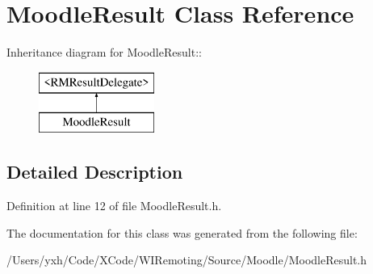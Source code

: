 \hypertarget{interface_moodle_result}{
\section{MoodleResult Class Reference}
\label{interface_moodle_result}
}
Inheritance diagram for MoodleResult::\begin{figure}[H]
\begin{center}
\leavevmode
\includegraphics[height=2cm]{interface_moodle_result}
\end{center}
\end{figure}


\subsection{Detailed Description}


Definition at line 12 of file MoodleResult.h.

The documentation for this class was generated from the following file:\begin{DoxyCompactItemize}
\item 
/Users/yxh/Code/XCode/WIRemoting/Source/Moodle/MoodleResult.h\end{DoxyCompactItemize}

